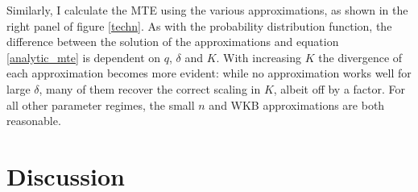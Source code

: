 Similarly, I calculate the MTE using the various approximations, as shown in the right panel of figure \ref{techn}. 
As with the probability distribution function, the difference between the solution of the approximations and equation \ref{analytic_mte} is dependent on $q$, $\delta$ and $K$. 
With increasing $K$ the divergence of each approximation becomes more evident: 
while no approximation works well for large $\delta$, many of them recover the correct scaling in $K$, albeit off by a factor. %
For all other parameter regimes, the small $n$ and WKB approximations are both reasonable. %



\section{Discussion}

